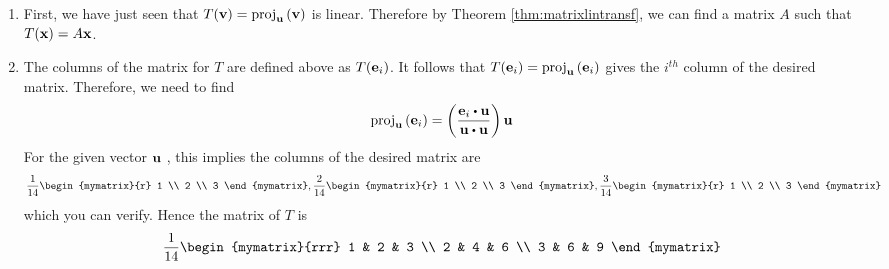 \begin{solution}
\begin{enumerate}
\item
First, we have just seen that $T ({\bf v}) = \mbox{proj}_{{\bf u}}\left( {\bf v}\right)$ is linear. Therefore by Theorem \ref{thm:matrixlintransf}, we can find a matrix $A$ such that $T({\bf x}) = A{\bf x}$. 

\item
The columns of the matrix for $T$ are defined above as $T({\bf e}_{i})$. 
It follows that $T({\bf e}_{i}) = \mbox{proj}
_{{\bf u}}\left( {\bf e}_{i}\right) $ gives the $i^{th}$ column of the
desired matrix. Therefore, we need to find
\begin{equation*}
\func{proj}_{\vect{u}}\left( \vect{e}_{i}\right) = \left( \vspace{0.05in}
\frac{\vect{e}_{i}\dotprod \vect{u}}{\vect{u}\dotprod \vect{u}}\right)
\vect{u}
\end{equation*}
For the given vector ${\bf u}$ , this implies the columns of the desired
matrix are
\begin{equation*}
\vspace{0.05in}\frac{1}{14}\begin{mymatrix}{r}
1 \\
2 \\
3
\end{mymatrix} ,\vspace{0.05in}\frac{2}{14}\begin{mymatrix}{r}
1 \\
2 \\
3
\end{mymatrix} ,\vspace{0.05in}\frac{3}{14}\begin{mymatrix}{r}
1 \\
2 \\
3
\end{mymatrix} 
\end{equation*}
which you can verify.
Hence the matrix of $T$ is
\begin{equation*}
\vspace{0.05in}\frac{1}{14}\begin{mymatrix}{rrr}
1 & 2 & 3 \\
2 & 4 & 6 \\
3 & 6 & 9
\end{mymatrix} 
\end{equation*}
\end{enumerate}
\end{solution}
